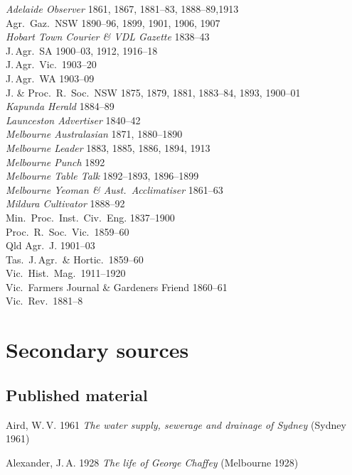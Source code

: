 \textsl{Adelaide Observer} 1861, 1867, 1881--83, 1888--89,1913\\
Agr.\ Gaz.\ NSW  1890--96, 1899, 1901, 1906, 1907\\
\textsl{Hobart Town Courier \& VDL Gazette} 1838--43\\ 
J.\,Agr.\ SA 1900--03, 1912, 1916--18\\
J.\,Agr.\ Vic.\ 1903--20\\
J.\,Agr.\ WA 1903--09\\
J. \& Proc.\ R.~Soc.\ NSW 1875, 1879, 1881, 1883--84, 1893, 1900--01\\
\textsl{Kapunda Herald} 1884--89\\
\textsl{Launceston Advertiser} 1840--42\\
\textsl{Melbourne Australasian} 1871, 1880--1890\\
\textsl{Melbourne Leader} 1883, 1885, 1886, 1894, 1913\\
\textsl{Melbourne Punch} 1892\\
\textsl{Melbourne Table Talk} 1892--1893, 1896--1899\\
\textsl{Melbourne Yeoman \& Aust.\ Acclimatiser} 1861--63\\
\textsl{Mildura Cultivator} 1888--92\\
Min.\ Proc.\ Inst.\ Civ.\ Eng. 1837--1900\\
Proc.\ R.~Soc.\ Vic.\ 1859--60\\
Qld Agr.\ J. 1901--03\\
Tas.\ J.\,Agr.\ \& Hortic.\  1859--60\\
Vic.\ Hist.\ Mag.\ 1911--1920\\
Vic.\ Farmers Journal \& Gardeners Friend 1860--61\\
Vic.\ Rev.\ 1881--8\\

\section*{Secondary sources}

\subsection*{Published material}

Aird, W.\,V. 1961 \textsl{The water supply, sewerage and drainage of
Sydney} (Sydney 1961)

Alexander, J.\,A.  1928 \textsl{The life of George Chaffey} (Melbourne
1928)


